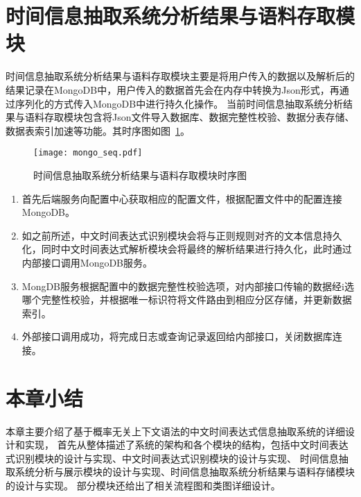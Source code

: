 

\section{时间信息抽取系统分析结果与语料存取模块}

时间信息抽取系统分析结果与语料存取模块主要是将用户传入的数据以及解析后的结果记录在MongoDB中，用户传入的数据首先会在内存中转换为Json形式，再通过序列化的方式传入MongoDB中进行持久化操作。
当前时间信息抽取系统分析结果与语料存取模块包含将Json文件导入数据库、数据完整性校验、数据分表存储、数据表索引加速等功能。其时序图如图~\ref{fig:mongo_seq}。


\begin{figure}[h]
    \centering
    \texttt{[image: mongo\_seq.pdf]}
    \caption{时间信息抽取系统分析结果与语料存取模块时序图}
    \label{fig:mongo_seq}
\end{figure}

\begin{enumerate}
    \item[(1)] 首先后端服务向配置中心获取相应的配置文件，根据配置文件中的配置连接MongoDB。
    \item[(2)] 如之前所述，中文时间表达式识别模块会将与正则规则对齐的文本信息持久化，同时中文时间表达式解析模块会将最终的解析结果进行持久化，此时通过内部接口调用MongoDB服务。
    \item[(3)] MongDB服务根据配置中的数据完整性校验选项，对内部接口传输的数据经i选哪个完整性校验，并根据唯一标识符将文件路由到相应分区存储，并更新数据索引。
    \item[(4)] 外部接口调用成功，将完成日志或查询记录返回给内部接口，关闭数据库连接。
\end{enumerate}


\section{本章小结}

本章主要介绍了基于概率无关上下文语法的中文时间表达式信息抽取系统的详细设计和实现，
首先从整体描述了系统的架构和各个模块的结构，包括中文时间表达式识别模块的设计与实现、中文时间表达式识别模块的设计与实现、
时间信息抽取系统分析与展示模块的设计与实现、时间信息抽取系统分析结果与语料存储模块的设计与实现。
部分模块还给出了相关流程图和类图详细设计。
